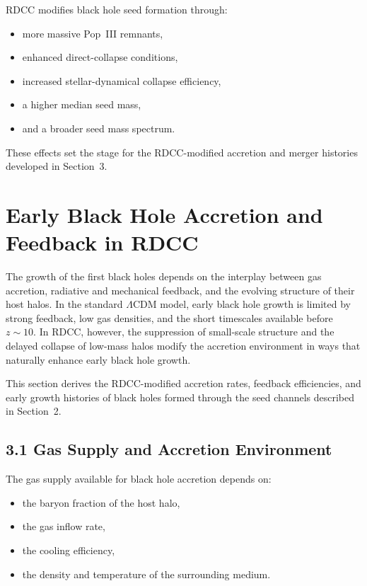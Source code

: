 \documentclass[11pt,a4paper]{article}
\begin{document}
RDCC modifies black hole seed formation through:

\begin{itemize}
    \item more massive Pop~III remnants,
    \item enhanced direct-collapse conditions,
    \item increased stellar-dynamical collapse efficiency,
    \item a higher median seed mass,
    \item and a broader seed mass spectrum.
\end{itemize}

These effects set the stage for the RDCC-modified accretion and merger histories developed in 
Section~3.

\section{Early Black Hole Accretion and Feedback in RDCC}

The growth of the first black holes depends on the interplay between gas accretion, 
radiative and mechanical feedback, and the evolving structure of their host halos. In the 
standard $\Lambda$CDM model, early black hole growth is limited by strong feedback, low gas 
densities, and the short timescales available before $z \sim 10$. In RDCC, however, the 
suppression of small-scale structure and the delayed collapse of low-mass halos modify the 
accretion environment in ways that naturally enhance early black hole growth.

This section derives the RDCC-modified accretion rates, feedback efficiencies, and early 
growth histories of black holes formed through the seed channels described in Section~2.

\subsection*{3.1 Gas Supply and Accretion Environment}

The gas supply available for black hole accretion depends on:

\begin{itemize}
    \item the baryon fraction of the host halo,
    \item the gas inflow rate,
    \item the cooling efficiency,
    \item the density and temperature of the surrounding medium.
\end{itemize}
\end{document}
